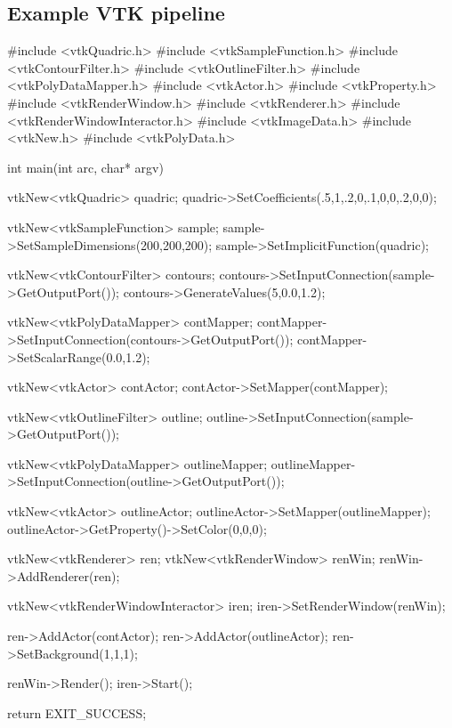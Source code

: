 \begin{appendices}

\chapter{Example VTK pipeline}
\label{apx:quadric-vtk}
	
\begin{cpp}[label=lst:quadricvtk,caption={Example of Quadric Contour in VTK used to produce Figure~\ref{fig:quadric-render-pipeline}.},aboveskip=20pt]
#include <vtkQuadric.h>
#include <vtkSampleFunction.h>
#include <vtkContourFilter.h>
#include <vtkOutlineFilter.h>
#include <vtkPolyDataMapper.h>
#include <vtkActor.h>
#include <vtkProperty.h>
#include <vtkRenderWindow.h>
#include <vtkRenderer.h>
#include <vtkRenderWindowInteractor.h>
#include <vtkImageData.h>
#include <vtkNew.h>
#include <vtkPolyData.h>

int main(int arc, char* argv)
{
	vtkNew<vtkQuadric> quadric;
	quadric->SetCoefficients(.5,1,.2,0,.1,0,0,.2,0,0);

	vtkNew<vtkSampleFunction> sample;
	sample->SetSampleDimensions(200,200,200);
	sample->SetImplicitFunction(quadric);

	vtkNew<vtkContourFilter> contours;
	contours->SetInputConnection(sample->GetOutputPort());
	contours->GenerateValues(5,0.0,1.2);

	vtkNew<vtkPolyDataMapper> contMapper;
	contMapper->SetInputConnection(contours->GetOutputPort());
	contMapper->SetScalarRange(0.0,1.2);

	vtkNew<vtkActor> contActor;
	contActor->SetMapper(contMapper);

	vtkNew<vtkOutlineFilter> outline;
	outline->SetInputConnection(sample->GetOutputPort());

	vtkNew<vtkPolyDataMapper> outlineMapper;
	outlineMapper->SetInputConnection(outline->GetOutputPort());

	vtkNew<vtkActor> outlineActor;
	outlineActor->SetMapper(outlineMapper);
	outlineActor->GetProperty()->SetColor(0,0,0);

	vtkNew<vtkRenderer> ren;
	vtkNew<vtkRenderWindow> renWin;
	renWin->AddRenderer(ren);

	vtkNew<vtkRenderWindowInteractor> iren;
	iren->SetRenderWindow(renWin);

	ren->AddActor(contActor);
	ren->AddActor(outlineActor);
	ren->SetBackground(1,1,1);

	renWin->Render();
	iren->Start();

	return EXIT_SUCCESS;
}
\end{cpp}
	

\end{appendices}
